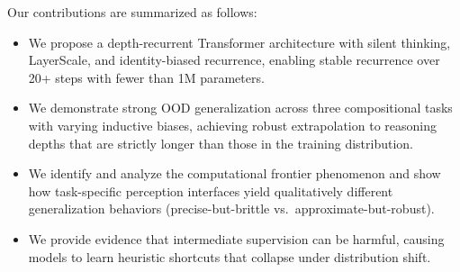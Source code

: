 Our contributions are summarized as follows:
\begin{itemize}
    \item We propose a depth-recurrent Transformer architecture with silent thinking, LayerScale, and identity-biased recurrence, enabling stable recurrence over 20+ steps with fewer than 1M parameters.
    \item We demonstrate strong OOD generalization across three compositional tasks with varying inductive biases, achieving robust extrapolation to reasoning depths that are strictly longer than those in the training distribution.
    \item We identify and analyze the computational frontier phenomenon and show how task-specific perception interfaces yield qualitatively different generalization behaviors (precise-but-brittle vs.\ approximate-but-robust).
    \item We provide evidence that intermediate supervision can be harmful, causing models to learn heuristic shortcuts that collapse under distribution shift.
\end{itemize}

